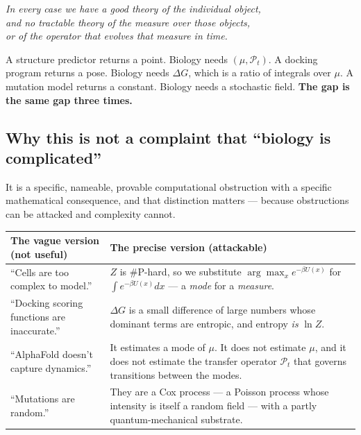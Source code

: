 \begin{thesisbox}[title={The thesis, stated once}]
\begin{center}\itshape\large
In every case we have a good theory of the individual object,\\and no tractable theory of the measure
over those objects,\\or of the operator that evolves that measure in time.
\end{center}
\vspace{2pt}
A structure predictor returns a point. Biology needs $(\mu,\mathcal{P}_t)$. A docking program returns
a pose. Biology needs $\Delta G$, which is a ratio of integrals over $\mu$. A mutation model returns a
constant. Biology needs a stochastic field. \textbf{The gap is the same gap three times.}
\end{thesisbox}

\subsection{Why this is not a complaint that ``biology is complicated''}

It is a specific, nameable, provable computational obstruction with a specific mathematical
consequence, and that distinction matters --- because obstructions can be attacked and complexity
cannot.

\begin{center}\small
\begin{tabular}{@{}>{\raggedright\arraybackslash}p{7.9cm}>{\raggedright\arraybackslash}p{8.7cm}@{}}
\toprule
\rowcolor{alert!10}
\textbf{\color{alert}The vague version (not useful)} & \textbf{\color{bio}The precise version (attackable)}\\
\midrule
``Cells are too complex to model.'' &
 $Z$ is \#P-hard, so we substitute $\arg\max_x e^{-\beta U(x)}$ for $\int e^{-\beta U(x)}dx$ ---
 a \emph{mode} for a \emph{measure}.\\
``Docking scoring functions are inaccurate.'' &
 $\Delta G$ is a small difference of large numbers whose dominant terms are entropic, and entropy
 \emph{is} $\ln Z$.\\
``AlphaFold doesn't capture dynamics.'' &
 It estimates a mode of $\mu$. It does not estimate $\mu$, and it does not estimate the transfer
 operator $\mathcal{P}_t$ that governs transitions between the modes.\\
``Mutations are random.'' &
 They are a Cox process --- a Poisson process whose intensity is itself a random field --- with a
 partly quantum-mechanical substrate.\\
\bottomrule
\end{tabular}
\end{center}
